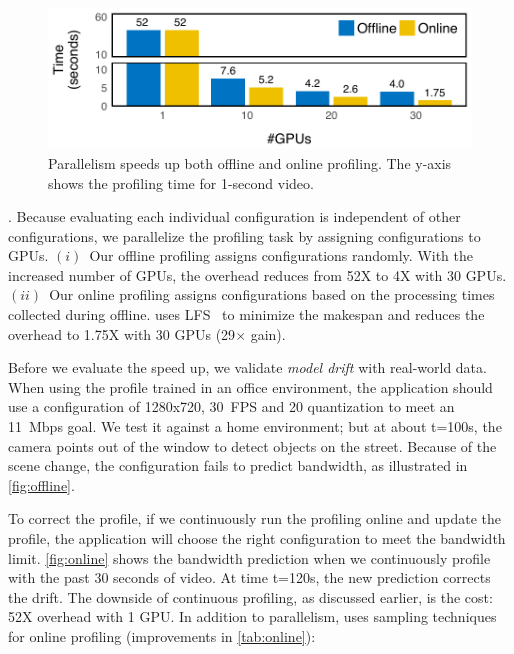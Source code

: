 \begin{figure}
  \centering
  \includegraphics[width=0.8\columnwidth]{figures/parallel.pdf}
  \vspace{-1em}
  \caption{Parallelism speeds up both offline and online profiling.  The y-axis
    shows the profiling time for 1-second video.}
  \label{fig:parallel}
  \vspace{-0.5em}
\end{figure}

. Because
evaluating each individual configuration is independent of other configurations,
we parallelize the profiling task by assigning configurations to GPUs.
$(i)$~Our offline profiling assigns configurations randomly.  With the increased
number of GPUs, the overhead reduces from 52X to 4X with 30 GPUs.  $(ii)$~Our
online profiling assigns configurations based on the processing times collected
during offline.  \sysname{} uses LFS~\cite{karger2010scheduling} to minimize the
makespan and reduces the overhead to 1.75X with 30 GPUs (29$\times$ gain).

  Before we evaluate the speed up, we validate
\textit{model drift} with real-world data. When using the profile trained in an
office environment, the application should use a configuration of 1280x720,
\SI{30}{FPS} and 20 quantization to meet an \SI{11}{Mbps} goal. We test it
against a home environment; but at about t=100s, the camera points out of the
window to detect objects on the street. Because of the scene change, the
configuration fails to predict bandwidth, as illustrated in
\autoref{fig:offline}.

To correct the profile, if we continuously run the profiling online and update
the profile, the application will choose the right configuration to meet the
bandwidth limit.  \autoref{fig:online} shows the bandwidth prediction when we
continuously profile with the past 30 seconds of video. At time t=120s, the new
prediction corrects the drift. The downside of continuous profiling, as
discussed earlier, is the cost: 52X overhead with 1 GPU\@. In addition to
parallelism, \sysname{} uses sampling techniques for online profiling
(improvements in \autoref{tab:online}):

